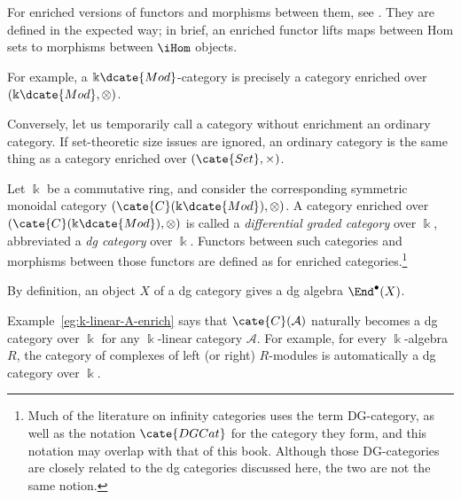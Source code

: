 For enriched versions of functors and morphisms between them, see
\cite[Definitions 3.4.1, 3.4.2, 3.4.4]{Li1}. They are defined in the expected
way; in brief, an enriched functor lifts maps between Hom sets to morphisms
between $\iHom$ objects.

For example, a $\Bbbk\dcate{Mod}$-category is precisely a category enriched
over $(\Bbbk\dcate{Mod},\otimes)$.

Conversely, let us temporarily call a category without enrichment an ordinary
category. If set-theoretic size issues are ignored, an ordinary category is
the same thing as a category enriched over $(\cate{Set},\times)$.

\begin{definition}\label{def:dgCat}
	Let $\Bbbk$ be a commutative ring, and consider the corresponding symmetric
	monoidal category $(\cate{C}(\Bbbk\dcate{Mod}),\otimes)$. A category
	enriched over $(\cate{C}(\Bbbk\dcate{Mod}),\otimes)$ is called a
	\emph{differential graded category} over $\Bbbk$, abbreviated a
	\emph{dg category} over $\Bbbk$. Functors between such categories and
	morphisms between those functors are defined as for enriched
	categories.\footnote{Much of the literature on infinity categories uses
	the term DG-category, as well as the notation $\cate{DGCat}$ for the
	category they form, and this notation may overlap with that of this book.
	Although those DG-categories are closely related to the dg categories
	discussed here, the two are not the same notion.}
\end{definition}

By definition, an object $X$ of a dg category gives a dg algebra
$\End^\bullet(X)$.

\begin{example}\label{eg:CA-dg-cat}
	Example~\ref{eg:k-linear-A-enrich} says that $\cate{C}(\mathcal{A})$
	naturally becomes a dg category over $\Bbbk$ for any $\Bbbk$-linear
	category $\mathcal{A}$. For example, for every $\Bbbk$-algebra $R$, the
	category of complexes of left (or right) $R$-modules is automatically a
	dg category over $\Bbbk$.
\end{example}

